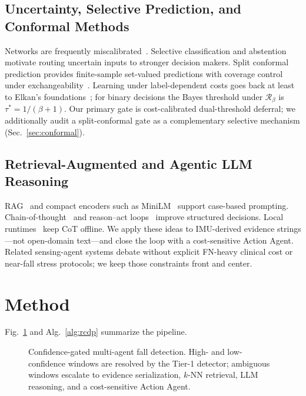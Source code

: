 \documentclass[journal]{IEEEtran}
\begin{document}
\subsection{Uncertainty, Selective Prediction, and Conformal Methods}
Networks are frequently miscalibrated~\cite{guo2017calibration,platt1999probabilistic}. Selective classification and abstention~\cite{el2010foundations,geifman2017selective} motivate routing uncertain inputs to stronger decision makers. Split conformal prediction provides finite-sample set-valued predictions with coverage control under exchangeability~\cite{vovk2005algorithmic,angelopoulos2023gentle}. Learning under label-dependent costs goes back at least to Elkan's foundations~\cite{elkan2001foundations}; for binary decisions the Bayes threshold under $\mathcal{R}_\beta$ is $\tau^*=1/(\beta{+}1)$. Our primary gate is cost-calibrated dual-threshold deferral; we additionally audit a split-conformal gate as a complementary selective mechanism (Sec.~\ref{sec:conformal}).

\subsection{Retrieval-Augmented and Agentic LLM Reasoning}
RAG~\cite{lewis2020rag} and compact encoders such as MiniLM~\cite{minilm2020} support case-based prompting. Chain-of-thought~\cite{wei2022cot} and reason--act loops~\cite{yao2023react} improve structured decisions. Local runtimes~\cite{ollama,mistral2023,qwen2024} keep CoT offline. We apply these ideas to IMU-derived evidence strings---not open-domain text---and close the loop with a cost-sensitive Action Agent. Related sensing-agent systems debate without explicit FN-heavy clinical cost or near-fall stress protocols; we keep those constraints front and center.

\section{Method}
\label{sec:method}

Fig.~\ref{fig:arch} and Alg.~\ref{alg:rcdp} summarize the pipeline.

\begin{figure}[!t]
\centering

\caption{Confidence-gated multi-agent fall detection. High- and low-confidence windows are resolved by the Tier-1 detector; ambiguous windows escalate to evidence serialization, $k$-NN retrieval, LLM reasoning, and a cost-sensitive Action Agent.}
\label{fig:arch}
\end{figure}
\end{document}
